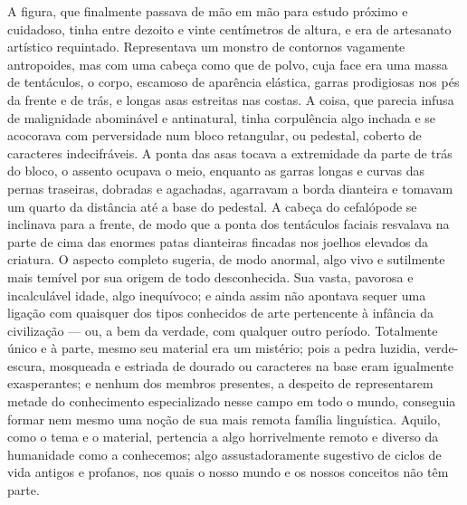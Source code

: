 A figura, que finalmente passava de mão em mão para estudo próximo e
cuidadoso, tinha entre dezoito e vinte centímetros de altura, e era de
artesanato artístico requintado. Representava um monstro de contornos
vagamente antropoides, mas com uma cabeça como que de polvo, cuja face
era uma massa de tentáculos, o corpo, escamoso de aparência elástica,
garras prodigiosas nos pés da frente e de trás, e longas asas estreitas
nas costas. A coisa, que parecia infusa de malignidade abominável e
antinatural, tinha corpulência algo inchada e se acocorava com
perversidade num bloco retangular, ou pedestal, coberto de caracteres
indecifráveis. A ponta das asas tocava a extremidade da parte de trás
do bloco, o assento ocupava o meio, enquanto as garras longas e curvas
das pernas traseiras, dobradas e agachadas, agarravam a borda dianteira
e tomavam um quarto da distância até a base do pedestal. A cabeça do
cefalópode se inclinava para a frente, de modo que a ponta dos
tentáculos faciais resvalava na parte de cima das enormes patas
dianteiras fincadas nos joelhos elevados da criatura. O aspecto completo
sugeria, de modo anormal, algo vivo e sutilmente mais temível por sua
origem de todo desconhecida. Sua vasta, pavorosa e incalculável idade,
algo inequívoco; e ainda assim não apontava sequer uma ligação com
quaisquer dos tipos conhecidos de arte pertencente à infância da
civilização --- ou, a bem da verdade, com qualquer outro período.
\mbox{Totalmente} único e à parte, mesmo seu material era um mistério; pois a
pedra luzidia, verde-escura, mosqueada e estriada de dourado ou
caracteres na base eram igualmente exasperantes; e nenhum dos membros
presentes, a despeito de representarem metade do conhecimento
especializado nesse campo em todo o mundo, conseguia formar nem mesmo
uma noção de sua mais remota família linguística. Aquilo, como o tema e
o material, pertencia a algo horrivelmente remoto e diverso da
humanidade como a conhecemos; algo assustadoramente sugestivo de ciclos
de vida antigos e profanos, nos quais o nosso mundo e os nossos
conceitos não têm parte.


